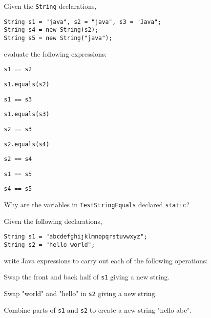 \begin{SSTUDY}

\item  Given the  {\tt String} declarations,

\begin{jjjlisting}
\begin{lstlisting}
String s1 = "java", s2 = "java", s3 = "Java";
String s4 = new String(s2);
String s5 = new String("java");
\end{lstlisting}
\end{jjjlisting}

\noindent evaluate the following expressions:

\begin{EXRLL}
\begin{multicols}{3}
\item  \verb|s1 == s2|       
\item  \verb|s1.equals(s2)|  
\item  \verb|s1 == s3|       
\item  \verb|s1.equals(s3)|  
\item  \verb|s2 == s3|       
\item  \verb|s2.equals(s4)|  
\item  \verb|s2 == s4|       
\item  \verb|s1 == s5|       
\item  \verb|s4 == s5|       
\end{multicols}
\end{EXRLL}


\item  Why are the variables in {\tt TestStringEquals} declared {\tt static}?

\item  Given the following declarations,

\begin{jjjlisting}
\begin{lstlisting}
String s1 = "abcdefghijklmnopqrstuvwxyz";
String s2 = "hello world";
\end{lstlisting}
\end{jjjlisting}

\noindent write Java expressions to carry out each of the following
operations:

\begin{EXRLL}
\item  Swap the front and back half of {\tt s1} giving a new string.
\item  Swap "world" and "hello" in {\tt s2} giving a new string.
\item  Combine parts of {\tt s1} and {\tt s2} to create a new string "hello abc".
\end{EXRLL}

\end{SSTUDY}


